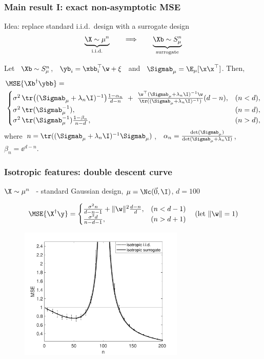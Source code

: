 \begin{frame}
  \frametitle{Main result I: exact non-asymptotic MSE}
  Idea: replace standard i.i.d.~design with a surrogate design
  \begin{align*}
    \underbrace{\X\sim\mu^n}_{\text{i.i.d.}}\qquad\Longrightarrow\qquad
    \underbrace{\Xb\sim S_\mu^n}_{\text{surrogate}} 
  \end{align*}
  \pause\vspace{-2mm}
  \begin{theorem}
\label{t:mse}
Let \ $\Xb\sim S_\mu^n$, \ $\yb_i=\xbb_i^\top\w+\xi$ \ and \
$\Sigmab_\mu=\E_\mu[\x\x^\top]$. Then,
  \begin{align*}
 &\MSE{\Xb^\dagger\ybb} =\\
  &  \begin{cases}
    \sigma^2\,\tr\big((\Sigmab_\mu+\lambda_n\I)^{-1}\big)
    \frac{1-\alpha_n}{d-n}\ +\
\frac{\w^{\top}(\Sigmab_\mu+\lambda_n\I)^{-1}\w}
{\tr((\Sigmab_\mu+\lambda_n\I)^{-1})}(d-n),
& (n<d),\\
\sigma^2\, \tr(\Sigmab_\mu^{-1}),& (n=d),\\
\sigma^2\,\tr(\Sigmab_\mu^{-1})\frac{1-\beta_n}{n-d},&(n>d),
\end{cases}
  \end{align*}
  \pause where
  $n=\tr((\Sigmab_\mu+\lambda_n\I)^{-1}\Sigmab_\mu)$, \
  $\alpha_n=\frac{\det(\Sigmab_\mu)}{\det(\Sigmab_\mu+\lambda_n\I)}$,
\ $\beta_n=\ee^{d-n}$.
\end{theorem}
\end{frame}

\begin{frame}
  \frametitle{Isotropic features: double descent curve}
  $\X\sim\mu^n$ \ - standard Gaussian design, $\mu=\Nc(\vec{0},\I)$, $d=100$

      \begin{align*}
        \MSE{\X^\dagger\y} =
        \begin{cases}
          \frac{\sigma^2n}{d-n-1} + \|\w\|^2\frac{d-n}{d},&(n<d-1)\\
          \frac{\sigma^2d}{n-d-1},&(n>d+1)
        \end{cases}\quad(\text{let }\|\w\|=1)
      \end{align*}
      \vspace{-2mm}
      \begin{figure}
          \centering
          \includegraphics[width=0.7\textwidth]{Figures/descent/descent-isotropic.pdf}
      \end{figure}
\end{frame}

